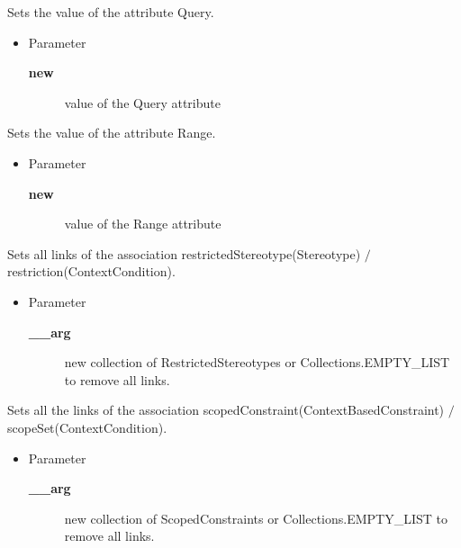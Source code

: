 \begin{desc}Sets the value of the attribute Query.
\begin{itemize}
\item{Parameter
  \begin{description}
   \item[{\bf new}]{value of the Query attribute}
  \end{description}}
\end{itemize}
\end{desc}

\begin{desc}Sets the value of the attribute Range.
\begin{itemize}
\item{Parameter
  \begin{description}
   \item[{\bf new}]{value of the Range attribute}
  \end{description}}
\end{itemize}
\end{desc}

\begin{desc}Sets all links of the association restrictedStereotype(Stereotype)
 $/$ restriction(ContextCondition).
\begin{itemize}
\item{Parameter
  \begin{description}
   \item[{\bf \_\_arg}]{new collection of RestrictedStereotypes or Collections.EMPTY\_LIST to
        remove all links.}
  \end{description}}
\end{itemize}
\end{desc}

\begin{desc}Sets all the links of the association scopedConstraint(ContextBasedConstraint)
 $/$ scopeSet(ContextCondition).
\begin{itemize}
\item{Parameter
  \begin{description}
   \item[{\bf \_\_arg}]{new collection of ScopedConstraints or Collections.EMPTY\_LIST to
        remove all links.}
  \end{description}}
\end{itemize}
\end{desc}

